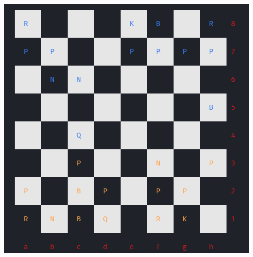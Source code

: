 \documentclass[a4paper, 12pt]{article}
\begin{document}
\begin{center}
\includegraphics[scale=0.63]{images/st_2_2.png}
\label{ncurses_board}
\end{center}
\end{document}
